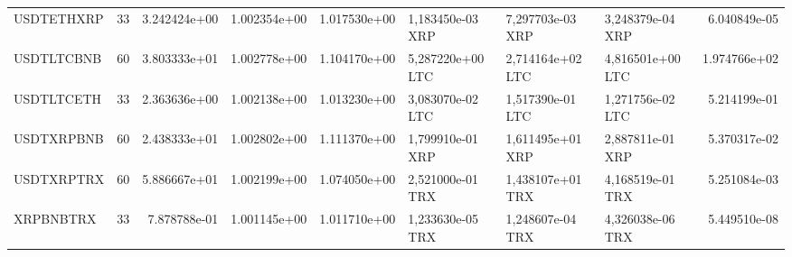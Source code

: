 \begin{tabular}{lrrrrlllr}
 USDTETHXRP &    33 &   3.242424e+00 &   1.002354e+00 &    1.017530e+00 &  1,183450e-03 XRP &   7,297703e-03 XRP &           3,248379e-04 XRP &                      6.040849e-05 \\
 USDTLTCBNB &    60 &   3.803333e+01 &   1.002778e+00 &    1.104170e+00 &  5,287220e+00 LTC &   2,714164e+02 LTC &           4,816501e+00 LTC &                      1.974766e+02 \\
 USDTLTCETH &    33 &   2.363636e+00 &   1.002138e+00 &    1.013230e+00 &  3,083070e-02 LTC &   1,517390e-01 LTC &           1,271756e-02 LTC &                      5.214199e-01 \\
 USDTXRPBNB &    60 &   2.438333e+01 &   1.002802e+00 &    1.111370e+00 &  1,799910e-01 XRP &   1,611495e+01 XRP &           2,887811e-01 XRP &                      5.370317e-02 \\
 USDTXRPTRX &    60 &   5.886667e+01 &   1.002199e+00 &    1.074050e+00 &  2,521000e-01 TRX &   1,438107e+01 TRX &           4,168519e-01 TRX &                      5.251084e-03 \\
  XRPBNBTRX &    33 &   7.878788e-01 &   1.001145e+00 &    1.011710e+00 &  1,233630e-05 TRX &   1,248607e-04 TRX &           4,326038e-06 TRX &                      5.449510e-08 \\
\bottomrule
\end{tabular}
